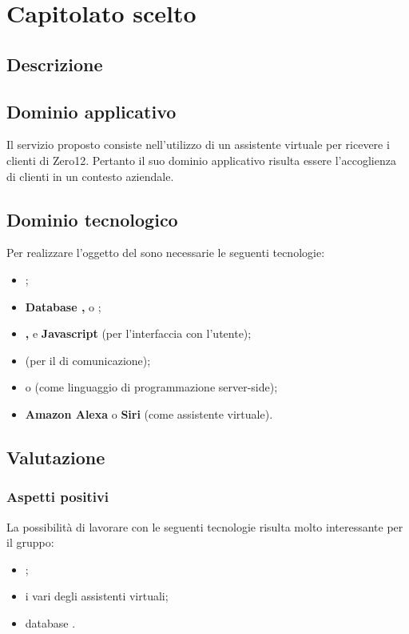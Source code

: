 \section {Capitolato scelto}
	\subsection {Descrizione}
		\SCOPO
	\subsection {Dominio applicativo}
Il servizio proposto consiste nell'utilizzo di un assistente virtuale per ricevere i clienti di Zero12. Pertanto il suo dominio applicativo risulta essere l'accoglienza di clienti in un contesto aziendale.
	\subsection {Dominio tecnologico}
		Per realizzare l'oggetto del  sono necessarie le seguenti tecnologie:
		\begin {itemize}
			\item \textbf{};
			\item \textbf{Database , } o \textbf{};
			\item \textbf{, } e \textbf{Javascript} (per l'interfaccia con l'utente);
			\item \textbf{} (per il  di comunicazione);
			\item \textbf{} o \textbf{} (come linguaggio di programmazione
 server-side);
 			\item \textbf{ Amazon Alexa} o \textbf{Siri} (come assistente virtuale).

		\end {itemize}
	\subsection {Valutazione}
		\subsubsection {Aspetti positivi}
			 La possibilità di lavorare con le seguenti tecnologie risulta molto interessante per il gruppo:
				 \begin {itemize}
				 	\item {};
				 	\item i vari  degli assistenti virtuali;
				 	\item database .
				 \end {itemize}
